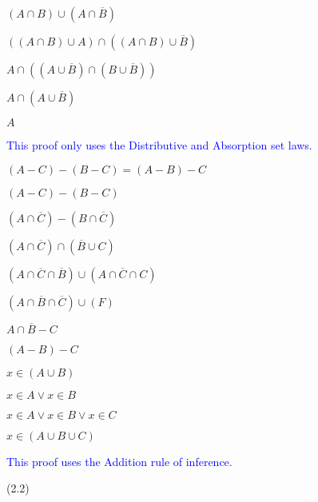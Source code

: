 \documentclass{exam}
\begin{document}
\begin{questions}
\begin{subparts}
\begin{center}

\( (A \cap B) \cup (A \cap \overline{B}) \)

\( ((A \cap B) \cup A) \cap ((A \cap B) \cup \overline{B}) \)

\( A \cap ((A \cup \overline{B}) \cap (B \cup \overline{B})) \)

\( A \cap (A \cup \overline{B})  \)

\( A \)

\textcolor{blue}{This proof only uses the Distributive and Absorption set laws.}

\end{center}


\begin{center}

\( (A - C) - (B - C) = (A - B) - C \)

\( (A - C) - (B - C) \)

\( (A \cap \overline{C}) - (B \cap \overline{C}) \)

\( (A \cap \overline{C}) \cap (\overline{B} \cup C) \)

\( (A \cap \overline{C} \cap \overline{B}) \cup (A \cap \overline{C} \cap C) \)

\( (A \cap \overline{B} \cap \overline{C}) \cup (F) \)

\( A \cap \overline{B} - C \)

\( (A - B) - C \)

\end{center}

\newpage


\begin{center}

\(x \in (A \cup B)\)

\(x \in A \lor x \in B \)

\(x \in A \lor x \in B \lor x \in C\)

\(x \in (A \cup B \cup C) \)

\textcolor{blue}{This proof uses the Addition rule of inference.}

\end{center}

\end{subparts}

 (2.2)
\begin{subparts}


\end{subparts}
\end{questions}
\end{document}
